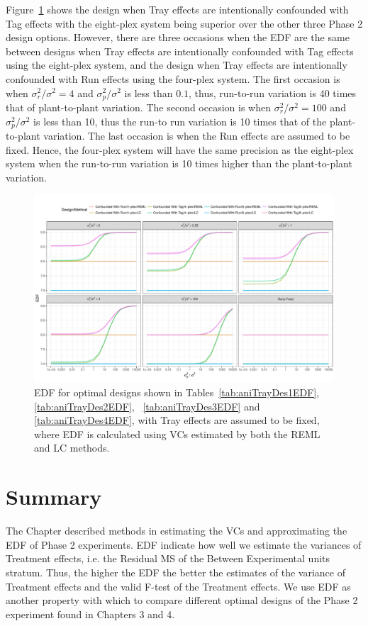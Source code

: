 Figure~\ref{fig:RCBD442Tag4vsTag8} shows the design when Tray effects are intentionally confounded with Tag effects with the eight-plex system being superior over the other three Phase 2 design options. However, there are three occasions when the EDF are the same between designs when Tray effects are intentionally confounded with Tag effects using the eight-plex system, and the design when Tray effects are intentionally confounded with Run effects using the four-plex system. The first occasion is when $\sigma_{r}^2/\sigma^2 = 4$ and $\sigma_{p}^2/\sigma^2$ is less than $0.1$, thus, run-to-run variation is 40 times that of plant-to-plant variation. The second occasion is when $\sigma_{r}^2/\sigma^2 = 100$ and  $\sigma_{p}^2/\sigma^2$ is less than 10, thus the run-to run variation is 10 times that of the plant-to-plant variation. The last occasion is when the Run effects are assumed to be fixed. Hence, the four-plex system will have the same precision as the eight-plex system when the run-to-run variation is 10 times higher than the plant-to-plant variation.  

\begin{figure}[h!]
\centering
\includegraphics[width=1 \textwidth]{Chapter5/Graph/CRD44424vs8.pdf}
\caption{EDF for optimal designs shown in Tables~\ref{tab:aniTrayDes1EDF}, \ref{tab:aniTrayDes2EDF}, ~\ref{tab:aniTrayDes3EDF} and \ref{tab:aniTrayDes4EDF}, with Tray effects are assumed to be fixed, where EDF is calculated using VCs estimated by both the REML and LC methods.}
\label{fig:RCBD442Tag4vsTag8}
\end{figure}


\section{Summary}
\label{sec:conclusionChap5}
The Chapter described methods in estimating the VCs and approximating the EDF of Phase 2 experiments. EDF indicate how well we estimate the variances of Treatment effects, i.e. the Residual MS of the Between Experimental units stratum. Thus, the higher the EDF the better the estimates of the variance of Treatment effects and the valid F-test of the Treatment effects. We use EDF as another property with which to compare different optimal designs of the Phase 2 experiment found in Chapters 3 and 4. 

